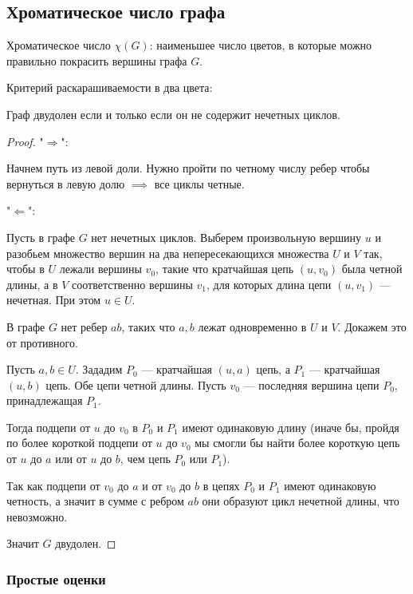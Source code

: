 \subsection{Хроматическое число графа}

\begin{defn}
    Хроматическое число $\chi(G)$: наименьшее число цветов, в которые можно правильно покрасить вершины графа $G$.
\end{defn}
Критерий раскарашиваемости в два цвета:

\begin{theorem}
    Граф двудолен если и только если он не содержит нечетных циклов.    
\end{theorem}

\begin{proof}
    
    "$\Rightarrow$":

    Начнем путь из левой доли. Нужно пройти по четному числу ребер чтобы вернуться в левую долю $\implies$ все циклы четные.

    "$\Leftarrow$":

    Пусть в графе $G$ нет нечетных циклов. Выберем произвольную вершину $u$ и разобьем множество вершин на два непересекающихся множества $U$ и $V$ так, чтобы в $U$ лежали вершины $v_0$, такие что кратчайшая цепь $(u, v_0)$ была четной длины, а в $V$ соответственно вершины $v_1$, для которых длина цепи $(u, v_1)$ --- нечетная. При этом $u \in U$. 

    В графе $G$ нет ребер $ab$, таких что $a, b$ лежат одновременно в $U$ и $V$. Докажем это от противного.

    Пусть $a, b \in U$. Зададим $P_0$ --- кратчайшая $(u, a)$ цепь, а $P_1$ --- кратчайшая $(u, b)$ цепь. Обе цепи четной длины. Пусть $v_0$ --- последняя вершина цепи $P_0$, принадлежащая $P_1$. 
    
    Тогда подцепи от $u$ до $v_0$ в $P_0$ и $P_1$ имеют одинаковую длину (иначе бы, пройдя по более короткой подцепи от $u$ до $v_0$ мы смогли бы найти более короткую цепь от $u$ до $a$ или от $u$ до $b$, чем цепь $P_0$ или $P_1$).

    Так как подцепи от $v_0$ до $a$ и от $v_0$ до $b$ в цепях $P_0$ и $P_1$ имеют одинаковую четность, а значит в сумме с ребром $ab$ они образуют цикл нечетной длины, что невозможно.

    Значит $G$ двудолен.
\end{proof}

\subsubsection*{Простые оценки}

